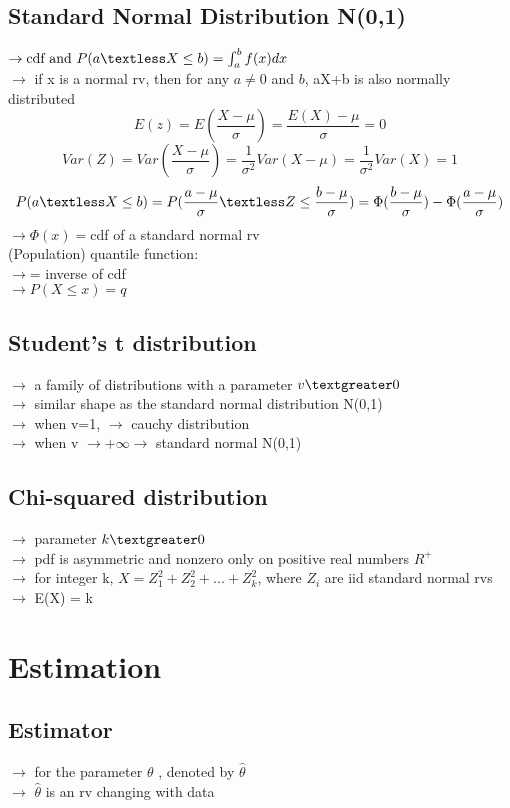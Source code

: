 \documentclass{article}
\begin{document}
\subsection{Standard Normal Distribution N(0,1)}
$\rightarrow \text{cdf and } P(a \textless X \leq b) = \int_a^b f(x)dx$\\
$\rightarrow$ if x is a normal rv, then for any $a\neq0$ and $b$, aX+b is also normally distributed\\
\[E(z) = E(\frac{X-\mu}{\sigma}) = \frac{E(X)-\mu}{\sigma} = 0\]
\[Var(Z) = Var(\frac{X-\mu}{\sigma}) = \frac{1}{\sigma^2}Var(X-\mu) = \frac{1}{\sigma^2}Var(X)=1\]
\[P(a \textless X \leq b) = P(\frac{a-\mu}{\sigma} \textless Z \leq \frac{b-\mu}{\sigma}) = \Phi(\frac{b-\mu}{\sigma})- \Phi(\frac{a-\mu}{\sigma})\]
$\rightarrow \Phi(x)=$cdf of a standard normal rv\\
(Population) quantile function:\\
$\rightarrow$= inverse of cdf\\
$\rightarrow P(X \leq x) =q$
\subsection{Student's t distribution}
$\rightarrow$ a family of distributions with a parameter $v \textgreater 0$\\
$\rightarrow$ similar shape as the standard normal distribution N(0,1)\\
$\rightarrow$ when v=1, $\rightarrow$ cauchy distribution\\
$\rightarrow$ when v $\rightarrow +\infty \rightarrow$ standard normal N(0,1)\\
\subsection{Chi-squared distribution}
$\rightarrow$ parameter $k \textgreater 0$\\
$\rightarrow$ pdf is asymmetric and nonzero only on positive real numbers $R^+$\\
$\rightarrow$ for integer k, $X = Z_1^2 +Z_2^2 +...+Z_k^2$, where $Z_i$ are iid standard normal rvs\\
$\rightarrow$ E(X) = k\\
\newpage
\section{Estimation}
\subsection{Estimator}
$\rightarrow$ for the parameter $\theta$ , denoted by $\hat{\theta}$\\
$\rightarrow$ $\hat{\theta}$ is an rv changing with data
\end{document}
